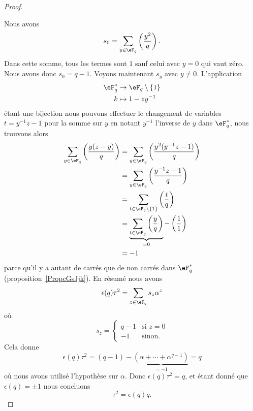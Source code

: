 \begin{proof}
\begin{itemize}
    \end{itemize}
    Nous avons
    \begin{equation}
        s_0=\sum_{y\in \eF_q}\left(\frac{y^2}{q}\right).
    \end{equation}
    Dans cette somme, tous les termes sont \( 1\) sauf celui avec \( y=0\) qui vaut zéro. Nous avons donc \( s_0=q-1\). Voyons maintenant \( s_y\) avec \( y\neq 0\). L'application
    \begin{equation}
        \begin{aligned}
            \eF^*_q&\to \eF_q\setminus\{ 1 \} \\
            k&\mapsto 1-zy^{-1}
        \end{aligned}
    \end{equation}
    étant une bijection nous pouvons effectuer le changement de variables \( t=y^{-1}z-1\) pour la somme sur \( y\) en notant \( y^{-1}\) l'inverse de \( y\) dans \( \eF^*_q\), nous trouvons alors
    \begin{subequations}
        \begin{align}
            \sum_{y\in \eF_q}\left(\frac{y(z-y)}{q}\right)&=\sum_{y\in \eF_q}\left(\frac{y^2(y^{-1}z-1)}{q}\right)\\
            &=\sum_{y\in \eF_q}\left(\frac{y^{-1}z-1}{q}\right)\\
            &=\sum_{t\in \eF_q\setminus\{ 1 \}}\left(\frac{t}{q}\right)\\
            &=\underbrace{\sum_{t\in \eF_q}\left(\frac{y}{q}\right)}_{=0}-\left(\frac{1}{1}\right)\\
            &=-1
        \end{align}
    \end{subequations}
    parce qu'il  y a autant de carrés que de non carrés dans \( \eF_q^*\) (proposition~\ref{PropcGsJjk}). En résumé nous avons
    \begin{equation}
        \epsilon(q)\tau^2=\sum_{z\in \eF_q}s_z\alpha^z
    \end{equation}
    où
    \begin{equation}
        s_z=\begin{cases}
            q-1    &   \text{si } z=0\\
            -1    &    \text{sinon}.
        \end{cases}
    \end{equation}
    Cela donne
    \begin{equation}
        \epsilon(q)\tau^2=(q-1)-\underbrace{(\alpha+\cdots +\alpha^{q-1})}_{=-1}=q
    \end{equation}
    où nous avons utilisé l'hypothèse sur \( \alpha\). Donc \( \epsilon(q)\tau^2=q\), et étant donné que \( \epsilon(q)=\pm 1\) nous concluons
    \begin{equation}
        \tau^2=\epsilon(q)q.
    \end{equation}


\end{proof}

